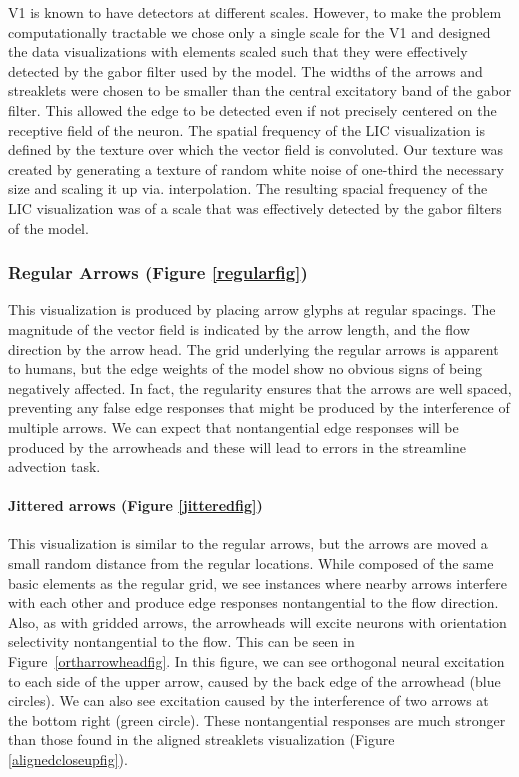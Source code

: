 V1 is known to have detectors at different scales. However, to make
the problem computationally tractable we chose only a single scale
for the V1 and designed the data visualizations with elements scaled
such that they were effectively detected by the gabor filter used by
the model. The widths of the arrows and streaklets were chosen to be
smaller than the central excitatory band of the gabor filter. This
allowed the edge to be detected even if not precisely centered on the
receptive field of the neuron. The spatial frequency of the LIC
visualization is defined by the texture over which the vector field
is convoluted. Our texture was created by generating a texture of
random white noise of one-third the necessary size and scaling it up
via. interpolation. The resulting spacial frequency of the LIC
visualization was of a scale that was effectively detected by the
gabor filters of the model.

\subsubsection{Regular Arrows (Figure \ref{regularfig})} This
visualization is produced by placing arrow glyphs at regular
spacings. The magnitude of the vector field is indicated by the arrow
length, and the flow direction by the arrow head. The grid underlying
the regular arrows is apparent to humans, but the edge weights of the
model show no obvious signs of being negatively affected. In fact,
the regularity ensures that the arrows are well spaced, preventing
any false edge responses that might be produced by the interference
of multiple arrows. We can expect that nontangential edge responses
will be produced by the arrowheads and these will lead to errors in
the streamline advection task.

\paragraph{Jittered arrows (Figure \ref{jitteredfig})}
This visualization is similar to the regular arrows, but the arrows
are moved a small random distance from the regular locations. While
composed of the same basic elements as the regular grid, we see
instances where nearby arrows interfere with each other and produce
edge responses nontangential to the flow direction. Also, as with
gridded arrows, the arrowheads will excite neurons with orientation
selectivity nontangential to the flow. This can be seen in
Figure~\ref{ortharrowheadfig}. In this figure, we can see orthogonal
neural excitation to each side of the upper arrow, caused by the back
edge of the arrowhead (blue circles). We can also see excitation
caused by the interference of two arrows at the bottom right (green
circle). These nontangential responses are much stronger than those
found in the aligned streaklets visualization (Figure \ref{alignedcloseupfig}).
